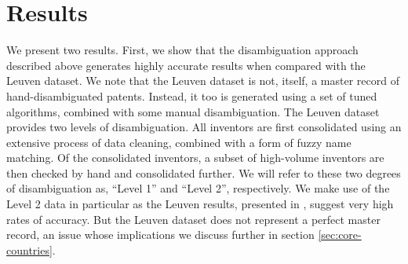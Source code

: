 \documentclass[11pt]{article}
\begin{document}

\section{Results}
\label{sec:results}


We present two results. First, we show that the disambiguation
approach described above generates highly accurate results when
compared with the Leuven dataset. We note that the Leuven dataset is
not, itself, a master record of hand-disambiguated patents. Instead,
it too is generated using a set of tuned algorithms, combined with
some manual disambiguation. The Leuven dataset provides two levels of
disambiguation. All inventors are first consolidated using an
extensive process of data cleaning, combined with a form of fuzzy name
matching. Of the consolidated inventors, a subset of high-volume
inventors are then checked by hand and consolidated further. We will
refer to these two degrees of disambiguation as, ``Level 1'' and
``Level 2'', respectively. We make use of the Level 2 data in
particular as the Leuven results, presented in
\cite{callaert2011patent}, suggest very high rates of
accuracy. But the Leuven dataset does not represent a perfect master
record, an issue whose implications we discuss further in section
\ref{sec:core-countries}. 
\end{document}
